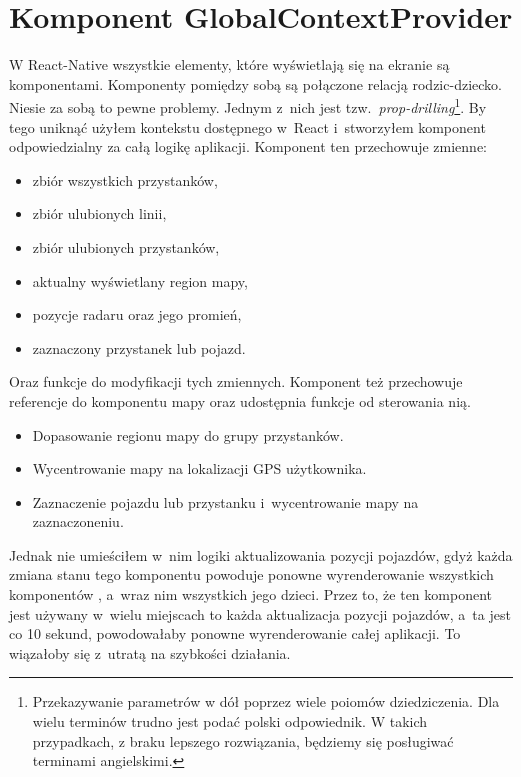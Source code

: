 \documentclass{SGGW-thesis}
\begin{document}
\section{Komponent GlobalContextProvider}
W React-Native wszystkie elementy, które wyświetlają się na ekranie są komponentami.
Komponenty pomiędzy sobą są połączone relacją rodzic-dziecko.
Niesie za sobą to pewne problemy.
Jednym z~nich jest tzw.~\textit{prop-drilling}\footnote{Przekazywanie parametrów w dół poprzez wiele poiomów dziedziczenia. Dla wielu terminów trudno jest podać polski odpowiednik. W takich przypadkach, z braku lepszego rozwiązania, będziemy się posługiwać terminami angielskimi.}. %
By tego uniknąć użyłem kontekstu dostępnego w~React i~stworzyłem komponent  odpowiedzialny za całą logikę aplikacji.
Komponent ten przechowuje zmienne:
\begin{itemize}
  \item{zbiór wszystkich przystanków,}
  \item{zbiór ulubionych linii,}
  \item{zbiór ulubionych przystanków,}
  \item{aktualny wyświetlany region mapy,}
  \item{pozycje radaru oraz jego promień,}
  \item{zaznaczony przystanek lub pojazd.}
\end{itemize}
Oraz funkcje do modyfikacji tych zmiennych. %
Komponent też przechowuje referencje do komponentu mapy oraz udostępnia funkcje od sterowania nią.
\begin{itemize}
  \item{Dopasowanie regionu mapy do grupy przystanków.}
  \item{Wycentrowanie mapy na lokalizacji GPS użytkownika.}
  \item{Zaznaczenie pojazdu lub przystanku i~wycentrowanie mapy na zaznaczoneniu.}
\end{itemize}

Jednak nie umieściłem w~nim logiki aktualizowania pozycji pojazdów, gdyż każda zmiana stanu
tego komponentu powoduje ponowne wyrenderowanie wszystkich komponentów , a~wraz nim wszystkich jego dzieci.
Przez to, że ten komponent jest używany w~wielu miejscach to każda aktualizacja pozycji pojazdów, a~ta
jest co 10 sekund, powodowałaby ponowne wyrenderowanie całej aplikacji.
To wiązałoby się z~utratą na szybkości działania.
\end{document}
